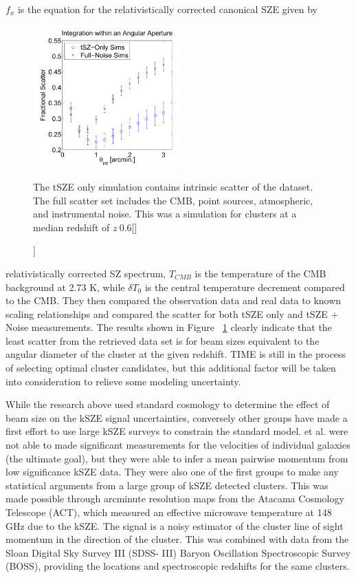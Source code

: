 \documentclass[manuscript]{aastex}
\begin{document}
$f_{x}$ is the equation for the relativistically corrected canonical SZE given by 
\begin{figure}
\vspace{-0.8cm}
  \begin{center}
    \includegraphics[width=0.5\textwidth]{saliwanchick1.png}
   \end{center}
\caption[MCMC Cluster Simulation Showing Scatter Versus Integration Angle -[\cite{Saliwanchik2015}]]{The tSZE only simulation contains intrinsic scatter of the dataset. The full scatter set includes the CMB, point sources, atmospheric, and instrumental noise. This was a simulation for clusters at a median redshift of $z ~ 0.6$[\cite{Saliwanchik2015}]}
\label{fig:sali1}
\end{figure}
relativistically corrected SZ spectrum, $T_{CMB}$ is the temperature of the CMB background at 2.73 K, while $\delta T_{0}$ is the central temperature decrement compared to the CMB. They then compared the observation data and real data to known scaling relationships and compared the scatter for both tSZE only and tSZE + Noise measurements. The results shown in Figure ~\ref{fig:sali1} clearly indicate that the least scatter from the retrieved data set is for beam sizes equivalent to the angular diameter of the cluster at the given redshift. TIME is still in the process of selecting optimal cluster candidates, but this additional factor will be taken into consideration to relieve some modeling uncertainty.  

While the research above used standard cosmology to determine the effect of beam size on the kSZE signal uncertainties, conversely other groups have made a first effort to use large kSZE surveys to constrain the standard model. \cite{Hand2012} et al. were not able to made significant measurements for the velocities of individual galaxies (the ultimate goal), but they were able to infer a mean pairwise momentum from low significance kSZE data. They were also one of the first groups to make any statistical arguments from a large group of kSZE detected clusters. This was made possible through arcminute resolution maps from the Atacama Cosmology Telescope (ACT), which measured an effective microwave temperature at 148 GHz due to the kSZE. The signal is a noisy estimator of the cluster line of sight momentum in the direction of the cluster. This was combined with data from the Sloan Digital Sky Survey III (SDSS- III) Baryon Oscillation Spectroscopic Survey (BOSS), providing the locations and spectroscopic redshifts for the same clusters. 
\end{document}
